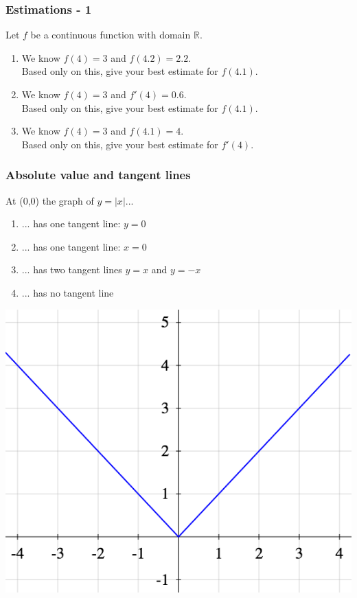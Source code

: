 \documentclass[14pt]{beamer}
\newcommand {\DS} [1] {${\displaystyle #1}$}
\newcommand {\R}{\mathbb{R}}
\begin{document}
\begin{frame}
\frametitle{Estimations - 1}

Let $f$ be a continuous function with domain $\R$.

\vfill

\begin{enumerate}
	\item  We know $f(4)=3$ and $f(4.2)=2.2$.  \\
		Based only on this, give your best estimate for $f(4.1)$.
\vfill

	\item  We know $f(4)=3$ and $f'(4)=0.6$. \\
		Based only on this, give your best estimate for $f(4.1)$.
\vfill
		
	\item  We know $f(4)=3$ and $f(4.1) = 4$. \\
		Based only on this, give your best estimate for $f'(4)$.	
\end{enumerate}

\vfill

\end{frame}
\begin{frame}[t]
\frametitle{Absolute value and tangent lines}


At (0,0) the graph of \DS{y=|x|}...
	\begin{enumerate}
		\item ... has one tangent line: $y=0$
		\item ... has one tangent line: $x=0$
		\item ... has two tangent lines $y=x$ and $y=-x$
		\item ... has no tangent line
	\end{enumerate} 

\begin{center}
	\includegraphics[scale=.25]{G8}
\end{center}

\end{frame}
\end{document}
